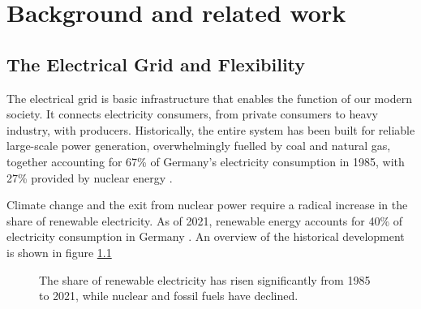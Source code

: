 
\chapter{Background and related work} \label{chap:background}
\section{The Electrical Grid and Flexibility}
The electrical grid is basic infrastructure that enables the function of our modern society.
It connects electricity consumers, from private consumers to heavy industry, with producers.
Historically, the entire system has been built for reliable large-scale power generation, overwhelmingly fuelled by coal and natural gas, together accounting for 67\% of Germany's electricity consumption in 1985, with 27\% provided by nuclear energy \citep{ritchie2022Energy}.

Climate change and the exit from nuclear power require a radical increase in the share of renewable electricity. As of 2021, renewable energy accounts for 40\% of electricity consumption in Germany \citep{ritchie2022Energy}.
An overview of the historical development is shown in figure \ref{fig:electricity_mix}

\begin{figure}
    \centering
    \caption{The share of renewable electricity has risen significantly from 1985 to 2021, while nuclear and fossil fuels have declined.}
    \label{fig:electricity_mix}
\end{figure}

